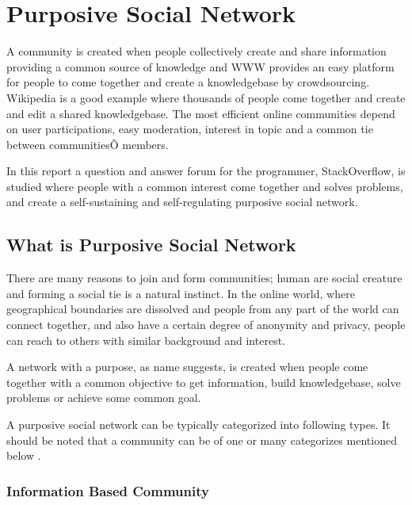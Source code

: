 

\chapter{Purposive Social Network} \label{Chapter:Purposive Social Network}

A community is created when people collectively create and share information providing a common source of knowledge and WWW provides an easy platform for people to come together and create a knowledgebase by crowdsourcing. Wikipedia is a good example where thousands of people come together and create and edit a shared knowledgebase. The most efficient online communities depend on user participations, easy moderation, interest in topic and a common tie between communitiesÕ members.

In this report a question and answer forum for the programmer, StackOverflow, is studied where people with a common interest come together and solves problems, and create a self-sustaining and self-regulating purposive social network.

\section{What is Purposive Social Network}

There are many reasons to join and form communities; human are social creature and forming a social tie is a natural instinct. In the online world, where geographical boundaries are dissolved and people from any part of the world can connect together, and also have a certain degree of anonymity and privacy, people can reach to others with similar background and interest.

A network with a purpose, as name suggests, is created when people come together with a common objective to get information, build knowledgebase, solve problems or achieve some common goal.

A purposive social network can be typically categorized into following types. It should be noted that a community can be of one or many categorizes mentioned below \cite{backstrom2006group}.


\subsection{Information Based Community}


